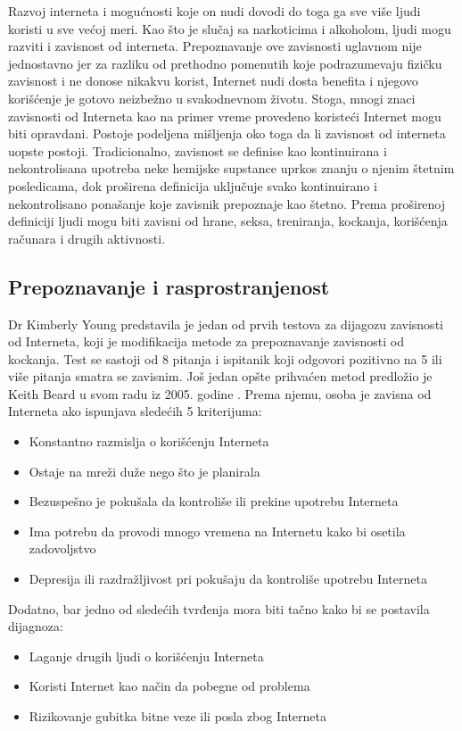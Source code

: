 \documentclass[a4paper]{article}
\begin{document}
Razvoj interneta i mogućnosti koje on nudi dovodi do toga ga sve više ljudi koristi u sve većoj meri.
Kao što je slučaj sa narkoticima i alkoholom, ljudi mogu razviti i zavisnost od interneta. Prepoznavanje ove zavisnosti uglavnom nije jednostavno jer za razliku od prethodno pomenutih koje podrazumevaju fizičku zavisnost i ne donose nikakvu korist, Internet nudi dosta benefita i njegovo korišćenje je gotovo neizbežno u svakodnevnom životu. Stoga, mnogi znaci zavisnosti od Interneta kao na primer vreme provedeno koristeći Internet mogu biti opravdani. Postoje podeljena mišljenja oko toga da li zavisnost od interneta uopste postoji. Tradicionalno, zavisnost se definise kao kontinuirana i nekontrolisana upotreba neke hemijske supstance uprkos znanju o njenim štetnim posledicama, dok proširena definicija uključuje svako  kontinuirano i nekontrolisano ponašanje koje zavisnik prepoznaje kao štetno. Prema proširenoj definiciji ljudi mogu biti zavisni od hrane, seksa, treniranja, kockanja, korišćenja računara i drugih aktivnosti.\cite{ethics}

\subsection{Prepoznavanje i rasprostranjenost}
\label{subsec:podnaslovZI1}

Dr Kimberly Young predstavila je jedan od prvih testova za dijagozu zavisnosti od Interneta, koji je modifikacija metode za prepoznavanje zavisnosti od kockanja. Test se sastoji od 8 pitanja i ispitanik koji odgovori pozitivno na 5 ili više pitanja smatra se zavisnim. \cite{ethics}
Još jedan opšte prihvaćen metod predložio je Keith Beard u svom radu iz 2005. godine \cite{diagnostic}. Prema njemu, osoba je zavisna od Interneta ako ispunjava sledećih 5 kriterijuma:
\begin{itemize}
  \item Konstantno razmislja o korišćenju Interneta
  \item Ostaje na mreži duže nego što je planirala
  \item Bezuspešno je pokušala da kontroliše ili prekine upotrebu Interneta
  \item Ima potrebu da provodi mnogo vremena na Internetu kako bi osetila zadovoljstvo
  \item Depresija ili razdražljivost pri pokušaju da kontroliše upotrebu Interneta
\end{itemize}

Dodatno, bar jedno od sledećih tvrđenja mora biti tačno kako bi se postavila dijagnoza:
\begin{itemize}
  \item Laganje drugih ljudi o korišćenju Interneta
  \item Koristi Internet kao način da pobegne od problema
  \item Rizikovanje gubitka bitne veze ili posla zbog Interneta
\end{itemize}
\end{document}
